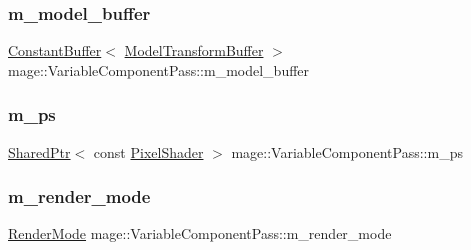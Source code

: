 \hypertarget{classmage_1_1_variable_component_pass_a3313fa671047d02a9c9b85fea85f545d}{}\label{classmage_1_1_variable_component_pass_a3313fa671047d02a9c9b85fea85f545d} 
\subsubsection{\texorpdfstring{m\+\_\+model\+\_\+buffer}{m\_model\_buffer}}
{\footnotesize\ttfamily \hyperlink{structmage_1_1_constant_buffer}{Constant\+Buffer}$<$ \hyperlink{structmage_1_1_model_transform_buffer}{Model\+Transform\+Buffer} $>$ mage\+::\+Variable\+Component\+Pass\+::m\+\_\+model\+\_\+buffer\hspace{0.3cm}{\ttfamily [private]}}

\hypertarget{classmage_1_1_variable_component_pass_a20d7e3c6b663544b84871f519284db2c}{}\label{classmage_1_1_variable_component_pass_a20d7e3c6b663544b84871f519284db2c} 
\subsubsection{\texorpdfstring{m\+\_\+ps}{m\_ps}}
{\footnotesize\ttfamily \hyperlink{namespacemage_a1e01ae66713838a7a67d30e44c67703e}{Shared\+Ptr}$<$ const \hyperlink{namespacemage_ac98506b7edd999ea43ec46fbd0330238}{Pixel\+Shader} $>$ mage\+::\+Variable\+Component\+Pass\+::m\+\_\+ps\hspace{0.3cm}{\ttfamily [private]}}

\hypertarget{classmage_1_1_variable_component_pass_a6e9a67c5251951f887d64c1a6d50a33c}{}\label{classmage_1_1_variable_component_pass_a6e9a67c5251951f887d64c1a6d50a33c} 
\subsubsection{\texorpdfstring{m\+\_\+render\+\_\+mode}{m\_render\_mode}}
{\footnotesize\ttfamily \hyperlink{namespacemage_a5e7e18b0154373ce8fc942fe3f6b27fd}{Render\+Mode} mage\+::\+Variable\+Component\+Pass\+::m\+\_\+render\+\_\+mode\hspace{0.3cm}{\ttfamily [private]}}

